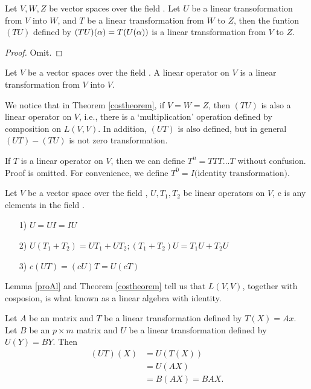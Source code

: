 \documentclass{mynotes}
\begin{document}
\begin{theorem}\label{costheorem}
Let $V,W,Z$ be vector spaces over the field \F. Let $U$ be a  linear transoformation from $V$ into $W$, and $T$ be a linear transformation from $W$ to $Z$, then the funtion $(TU)$ defined by $(TU)(\alpha) = T(U{(\alpha)})$ is a linear transformation from $V$
 to $Z$.
 \end{theorem}
\begin{proof}Omit.\end{proof}
\begin{definition}
Let $V$ be a vector spaces over the field \F. A linear operator on $V$ is a linear transformation from $V$ into $V$.
\end{definition}
\begin{remark}
We notice that in Theorem \ref{costheorem}, if $V=W=Z$, then $(TU)$ is also a linear operator on $V$, i.e., there is a `multiplication' operation defined by composition on $L(V,V)$. In addition, $(UT)$ is also defined, but in general $(UT)-(TU)$ is not zero transformation.
\end{remark}
\begin{remark}
If $T$ is a linear operator on $V$, then we can define $T^n = TTT\ldots T$ without confusion. Proof is omitted. For convenience, we define $T^0=I\mbox{(identity transformation)}.$
\end{remark}
\begin{lemma}\label{proAl}
Let $V$ be a vector space over the field \F, $U,T_1,T_2$ be linear operators on $V$, c is any elements in the field \F.
\begin{itemize}
	\item[1)] $U=UI=IU$
	\item[2)] $U(T_1+T_2) = UT_1+UT_2;(T_1+T_2)U=T_1U+T_2U$
	\item[3)] $c(UT) = (cU)T=U(cT)$
\end{itemize}
\end{lemma}
\begin{remark}
Lemma \ref{proAl} and Theorem \ref{costheorem} tell us that $L(V,V)$, together with cosposion, is what known as a linear algebra with identity.
\end{remark}
\begin{example}
Let $A$ be an \mbyn matrix and $T$ be a linear transformation defined by $T(X) = Ax$. Let $B$ be an $p\times m$ matrix and $U$ be a linear transformation defined by $U(Y) = BY$. Then \begin{align*}(UT)(X) &= U(T(X))\\&=U(AX)\\&=B(AX)=BAX.\end{align*}
\end{example}
\end{document}
